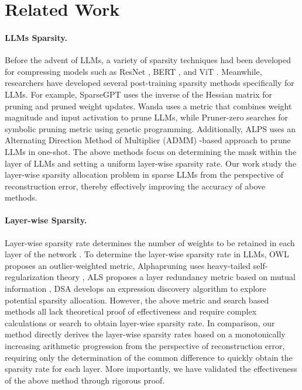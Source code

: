 \section{Related Work}\label{RelatedWork}
\paragraph{LLMs Sparsity.} 
Before the advent of LLMs, a variety of sparsity techniques had been developed for compressing models such as ResNet \citep{yu2022combinatorial, zhang2024how} , BERT \citep{xia2022structured, li2023losparse}, and ViT \citep{yu2022width, he2024pruning}. Meanwhile, researchers have developed several post-training sparsity methods specifically for LLMs. For example, SparseGPT \citep{frantar2023sparsegpt} uses the inverse of the Hessian matrix for pruning and pruned weight updates. Wanda \citep{sun2023simple} uses a metric that combines weight magnitude and input activation to prune LLMs, while Pruner-zero \citep{dong2024pruner} searches for symbolic pruning metric using genetic programming. Additionally, ALPS \citep{meng2024alps} uses an Alternating Direction Method of Multiplier (ADMM) \citep{boyd2011distributed}-based approach to prune LLMs in one-shot. The above methods focus on determining the mask within the layer of LLMs and setting a uniform layer-wise sparsity rate. Our work study the layer-wise sparsity allocation problem in sparse LLMs from the perspective of reconstruction error, thereby effectively improving the accuracy of above methods.
\paragraph{Layer-wise Sparsity.} Layer-wise sparsity rate determines the number of weights to be retained in each layer of the network \citep{lee2020layer, liu2022unreasonable}. To determine the layer-wise sparsity rate in LLMs, OWL\citep{yin2023outlier} proposes an outlier-weighted metric, Alphapruning \citep{lu2024alphapruning} uses heavy-tailed self-regularization theory \citep{martin2019traditional}, ALS \citep{li2024adaptive} proposes a layer redundancy metric based on mutual information \citep{kraskov2004estimating}, DSA \citep{li2024discovering} develops an expression discovery algorithm to explore potential sparsity allocation. However, the above metric and search based methods all lack theoretical proof of effectiveness and require complex calculations or search to obtain layer-wise sparsity rate. In comparison, our method directly derives the layer-wise sparsity rates based on a monotonically increasing arithmetic progression from the perspective of reconstruction error, requiring only the determination of the common difference to quickly obtain the sparsity rate for each layer. More importantly, we have validated the effectiveness of the above method through rigorous proof.


